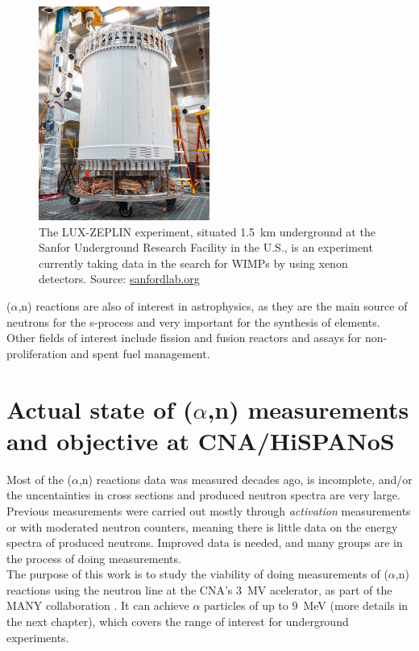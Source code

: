 \documentclass[a4paper,12pt]{report}
\newcommand{\an}{($\alpha$,n) }
\begin{document}
\begin{figure}[H]
	\centering
	\includegraphics[width=0.5\textwidth]{sanford.jpg}
	\caption{The LUX-ZEPLIN experiment, situated \qty{1.5}{\kilo\meter} underground at the Sanfor Underground Research Facility in the U.S., is an experiment currently taking data in the search for WIMPs by using xenon detectors.
	Source: \href{https://sanfordlab.org/experiment/lux-zeplin}{sanfordlab.org}}
	\label{sanford}
\end{figure}

\an reactions are also of interest in astrophysics, as they are the main source of neutrons for the s-process and very important for the synthesis of elements.\cite{astro1}\cite{astro2}
Other fields of interest include fission and fusion reactors and assays for non-proliferation and spent fuel management.\cite{INDC}

\section{Actual state of \an measurements and objective at CNA/HiSPANoS}
Most of the \an reactions data was measured decades ago, is incomplete, and/or the uncentainties in cross sections and produced neutron spectra are very large.
Previous measurements were carried out mostly through \textit{activation} measurements or with moderated neutron counters, meaning there is little data on the energy spectra of produced neutrons.
Improved data is needed, and many groups are in the process of doing measurements.\cite{INDC}
\\

The purpose of this work is to study the viability of doing measurements of \an reactions using the neutron line at the CNA's \qty{3}{\mega\volt} acelerator, as part of the MANY collaboration \cite{MANY}\cite{hispanos}.
It can achieve $\alpha$ particles of up to \qty{9}{\mega\eV} (more details in the next chapter), which covers the range of interest for underground experiments.\cite{CNA}
\end{document}
